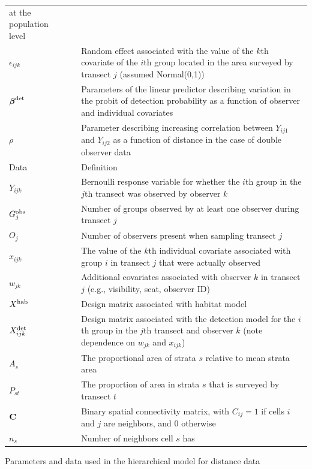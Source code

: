 \documentclass[10pt]{article}
\begin{document}
\begin{table}
\begin{tabular}{p{1.5cm}l p{12.5cm}}
                          at the population level \\
$\epsilon_{ijk}$ & & Random effect associated with the value of the $k$th covariate of the
                $i$th group located in the area surveyed by transect $j$ (assumed Normal(0,1))\\
$\boldsymbol{\beta}^{\rm det}$ & & Parameters of the linear predictor describing variation
        in the probit of detection probability as a function of observer and individual covariates \\
$\rho$ & & Parameter describing increasing correlation between $Y_{ij1}$ and $Y_{ij2}$ as a function of distance in the case of double observer data\\
Data & & Definition \\
\cline{1-1} \cline{3-3}
$Y_{ijk}$ &  & Bernoulli response variable for whether the $i$th group in the $j$th transect
                was observed by observer $k$\\
$G_j^{\rm obs}$ & & Number of groups observed by at least one observer during transect $j$\\
$O_j$   & & Number of observers present when sampling transect $j$ \\
$x_{ijk}$   & &  The value of the $k$th individual covariate associated with group
                $i$ in transect $j$ that were actually observed\\
$w_{jk}$ & & Additional covariates associated with observer $k$ in transect $j$ (e.g.,
            visibility, seat, observer ID)\\
$X^{\rm hab}$   & &  Design matrix associated with habitat model\\
$X^{\rm det}_{ijk}$   & &  Design matrix associated with the detection model for the $i$th group in the $j$th transect
                and observer $k$ (note dependence on
                $w_{jk}$ and $x_{ijk}$) \\
$A_s$   & & The proportional area of strata $s$ relative to mean strata area\\
$P_{st}$   & & The proportion of area in strata $s$ that is surveyed by transect $t$\\
${\bf C}$ & & Binary spatial connectivity matrix, with $C_{ij}=1$ if cells $i$ and $j$ are neighbors, and 0 otherwise\\
$n_s$   & & Number of neighbors cell $s$ has\\
\hline
\end{tabular}
\begin{flushleft}Parameters and data used in the hierarchical model for distance data
\end{flushleft}
\label{tab:defs}
\end{table}

\end{document}

